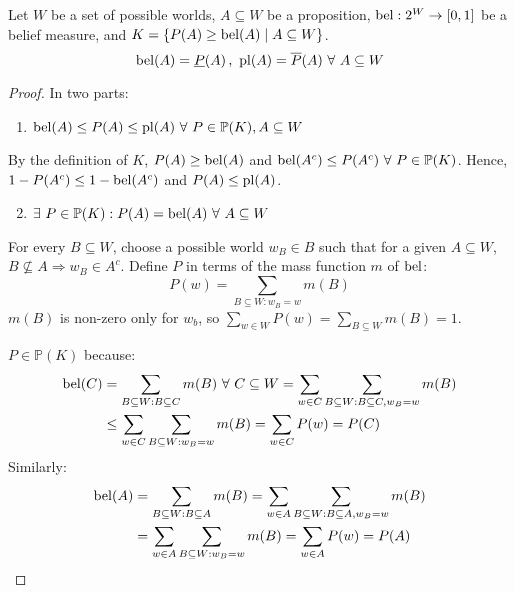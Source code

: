 \begin{thm}
  Let $W$ be a set of possible worlds, $A \subseteq W$ be a proposition,
  $\operatorname*{bel} : 2^W \to [0, 1]$ be a belief measure, and
  $K = \{ P(A) \geq \operatorname*{bel}(A) \mid A \subseteq W \}$.
  \begin{equation}
    \operatorname*{bel}(A) = \underline{P}(A)\,,\
    \operatorname*{pl}(A) = \overline{P}(A)
    \ \forall\ A \subseteq W
  \end{equation}
  \begin{proof}
    In two parts:
    \begin{enumerate}
      \item $\bel(A) \leq P(A) \leq \pl(A) \ \forall\ P \in \mathbb{P}(K), A \subseteq W$
    \end{enumerate}

    By the definition of $K$,
    $P(A) \geq \operatorname*{bel}(A)$ and $\operatorname*{bel}(A^c) \leq P(A^c) \ \forall\ P \in \mathbb{P}(K)$.
    Hence, $1 - P(A^c) \leq 1 - \operatorname*{bel}(A^c)$ and $P(A) \leq \operatorname*{pl}(A)$.

    \begin{enumerate}
      \setcounter{enumi}{1}
      \item $\exists\ P \in \mathbb{P}(K) : P(A) = \operatorname*{bel}(A) \ \forall\ A \subseteq W$
    \end{enumerate}

    For every $B \subseteq W$, choose a possible world $w_B \in B$ such that
    for a given $A \subseteq W$,  $B \not\subseteq A \Rightarrow w_B \in A^c$.
    Define $P$ in terms of the mass function $m$ of $\operatorname*{bel}$:
    \begin{equation*}
      P(w) = \sum_{B \subseteq W : w_B = w} m(B)
    \end{equation*}
    $m(B)$ is non-zero only for $w_b$, so
    $\sum_{w \in W} P(w) = \sum_{B \subseteq W} m(B) = 1$.

    $P \in \mathbb{P}(K)$ because:
    \begin{align*}
      \operatorname*{bel}(C)
       & = \sum_{B \subseteq W : B \subseteq C} m(B) \ \forall\ C \subseteq W
      = \sum_{w \in C} \sum_{B \subseteq W : B \subseteq C, w_B = w} m(B)     \\
       & \leq \sum_{w \in C} \sum_{B \subseteq W : w_B = w} m(B)
      = \sum_{w \in C} P(w)
      = P(C)
    \end{align*}
    Similarly:
    \begin{align*}
      \operatorname*{bel}(A)
       & = \sum_{B \subseteq W : B \subseteq A} m(B)
      = \sum_{w \in A} \sum_{B \subseteq W : B \subseteq A, w_B = w} m(B) \\
       & = \sum_{w \in A} \sum_{B \subseteq W : w_B = w} m(B)
      = \sum_{w \in A} P(w)
      = P(A)
    \end{align*}
  \end{proof}
\end{thm}

